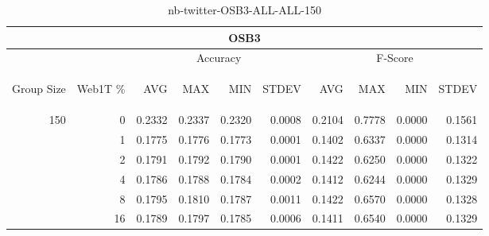 \begin{center}
\begin{table}[htbp]
\begin{tabular}{ | r | r | r | r | r | r | r | r | r | r |}
\hline
\multicolumn{10}{|c|}{OSB3}\\
\hline
 & & \multicolumn{4}{|c|}{Accuracy} & \multicolumn{4}{|c|}{F-Score}\\ \cline{3-10}
\begin{sideways}Group Size\end{sideways} & \begin{sideways}Web1T \%\end{sideways} & \begin{sideways}AVG\end{sideways} & \begin{sideways}MAX\end{sideways} & \begin{sideways}MIN\end{sideways} & \begin{sideways}STDEV\end{sideways} & \begin{sideways}AVG\end{sideways} & \begin{sideways}MAX\end{sideways} & \begin{sideways}MIN\end{sideways} & \begin{sideways}STDEV\end{sideways}\\
\hline
\multirow{5}{*}{150}
 & 0 & 0.2332 & 0.2337 & 0.2320 & 0.0008 & 0.2104 & 0.7778 & 0.0000 & 0.1561\\ \cline{2-10}
 & 1 & 0.1775 & 0.1776 & 0.1773 & 0.0001 & 0.1402 & 0.6337 & 0.0000 & 0.1314\\ \cline{2-10}
 & 2 & 0.1791 & 0.1792 & 0.1790 & 0.0001 & 0.1422 & 0.6250 & 0.0000 & 0.1322\\ \cline{2-10}
 & 4 & 0.1786 & 0.1788 & 0.1784 & 0.0002 & 0.1412 & 0.6244 & 0.0000 & 0.1329\\ \cline{2-10}
 & 8 & 0.1795 & 0.1810 & 0.1787 & 0.0011 & 0.1422 & 0.6570 & 0.0000 & 0.1328\\ \cline{2-10}
 & 16 & 0.1789 & 0.1797 & 0.1785 & 0.0006 & 0.1411 & 0.6540 & 0.0000 & 0.1329\\ \cline{2-10}
\hline
\end{tabular}
\caption{nb-twitter-OSB3-ALL-ALL-150}
\label{table:nb-twitter-OSB3-ALL-ALL-150}
\end{table}
\end{center}


